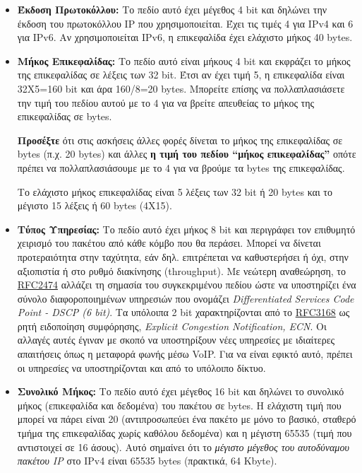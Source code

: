 \begin{itemize}
\item \textbf{Έκδοση Πρωτοκόλλου:} Το πεδίο αυτό έχει μέγεθος 4 bit και δηλώνει την έκδοση του πρωτοκόλλου IP που χρησιμοποιείται. Έχει τις τιμές 4 για IPv4 και 6 για IPv6. Αν χρησιμοποιείται IPv6, η επικεφαλίδα έχει ελάχιστο μήκος 40 bytes.
\item \textbf{Μήκος Επικεφαλίδας:} Το πεδίο αυτό είναι μήκους 4 bit και εκφράζει το μήκος της επικεφαλίδας σε λέξεις των 32 bit. Έτσι αν έχει τιμή 5, η επικεφαλίδα είναι 32Χ5=160 bit και άρα 160/8=20 bytes. Μπορείτε επίσης να πολλαπλασιάσετε την τιμή του πεδίου αυτού με το 4 για να βρείτε απευθείας το μήκος της επικεφαλίδας σε bytes.

\begin{inthebox}
\textbf{Προσέξτε} ότι στις ασκήσεις άλλες φορές δίνεται το μήκος της επικεφαλίδας σε bytes (π.χ. 20 bytes) και άλλες \textbf{η τιμή του πεδίου ``μήκος επικεφαλίδας''} οπότε πρέπει να πολλαπλασιάσουμε με το 4 για να βρούμε τα bytes της επικεφαλίδας.\\
\end{inthebox}

Το ελάχιστο μήκος επικεφαλίδας είναι 5 λέξεις των 32 bit ή 20 bytes και το μέγιστο 15 λέξεις ή 60 bytes (4X15).
\item \textbf{Τύπος Υπηρεσίας:} Το πεδίο αυτό έχει μήκος 8 bit και περιγράφει τον επιθυμητό χειρισμό του πακέτου από κάθε κόμβο που θα περάσει. Μπορεί να δίνεται προτεραιότητα στην ταχύτητα, εάν δηλ. επιτρέπεται να καθυστερήσει ή όχι, στην αξιοπιστία ή στο ρυθμό διακίνησης (throughput). Με νεώτερη αναθεώρηση, το \href{https://tools.ietf.org/html/rfc2474}{RFC2474} αλλάζει τη σημασία του συγκεκριμένου πεδίου ώστε να υποστηρίζει ένα σύνολο διαφοροποιημένων υπηρεσιών που ονομάζει \emph{Differentiated Services Code Point - DSCP (6 bit)}. Τα υπόλοιπα 2 bit χαρακτηρίζονται από το \href{https://tools.ietf.org/html/rfc3168}{RFC3168}  ως ρητή ειδοποίηση συμφόρησης, \emph{Explicit Congestion Notification, ECN}. Οι αλλαγές αυτές έγιναν με σκοπό να υποστηρίξουν νέες υπηρεσίες με ιδιαίτερες απαιτήσεις όπως η μεταφορά φωνής μέσω VoIP. Για να είναι εφικτό αυτό, πρέπει οι υπηρεσίες να υποστηρίζονται και από το υπόλοιπο δίκτυο. 

\item \textbf{Συνολικό Μήκος:} Το πεδίο αυτό έχει μέγεθος 16 bit και δηλώνει το συνολικό μήκος (επικεφαλίδα και δεδομένα) του πακέτου σε bytes. Η ελάχιστη τιμή που μπορεί να πάρει είναι 20 (αντιπροσωπεύει ένα πακέτο με μόνο το βασικό, σταθερό τμήμα της επικεφαλίδας χωρίς καθόλου δεδομένα) και η μέγιστη 65535 (τιμή που αντιστοιχεί σε 16 άσους). Αυτό σημαίνει ότι το \emph{μέγιστο μέγεθος του αυτοδύναμου πακέτου IP} στο IPv4 είναι 65535 bytes (πρακτικά, 64 Kbyte).


\end{itemize}
